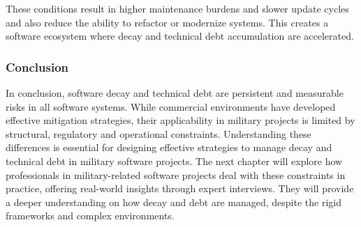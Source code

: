 These conditions result in higher maintenance burdens and slower update cycles and also reduce the ability to refactor or modernize systems. This creates a software ecosystem where decay and technical debt accumulation are accelerated.

\subsubsection{Conclusion}
In conclusion, software decay and technical debt are persistent and measurable risks in all software systems. While commercial environments have developed effective mitigation strategies, their applicability in military projects is limited by structural, regulatory and operational constraints.
Understanding these differences is essential for designing effective strategies to manage decay and technical debt in military software projects. The next chapter will explore how professionals in military-related software projects deal with these constraints in practice, offering real-world
insights through expert interviews. They will provide a deeper understanding on how decay and debt are managed, despite the rigid frameworks and complex environments.

